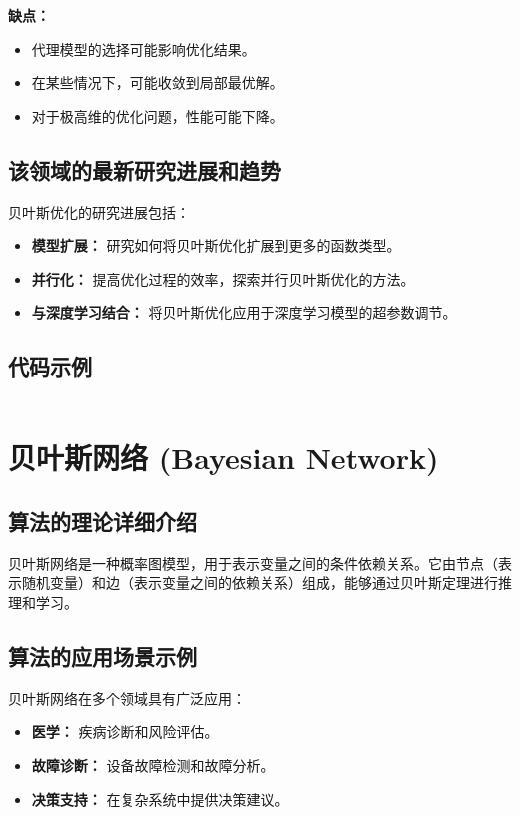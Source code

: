 \textbf{缺点：}
\begin{itemize}
    \item 代理模型的选择可能影响优化结果。
    \item 在某些情况下，可能收敛到局部最优解。
    \item 对于极高维的优化问题，性能可能下降。
\end{itemize}

\subsection*{该领域的最新研究进展和趋势}
贝叶斯优化的研究进展包括：
\begin{itemize}
    \item \textbf{模型扩展：} 研究如何将贝叶斯优化扩展到更多的函数类型。
    \item \textbf{并行化：} 提高优化过程的效率，探索并行贝叶斯优化的方法。
    \item \textbf{与深度学习结合：} 将贝叶斯优化应用于深度学习模型的超参数调节。
\end{itemize}
\subsection*{代码示例}
\begin{lstlisting}

\end{lstlisting}


\section{贝叶斯网络 (Bayesian Network)}
\subsection*{算法的理论详细介绍}
贝叶斯网络是一种概率图模型，用于表示变量之间的条件依赖关系。它由节点（表示随机变量）和边（表示变量之间的依赖关系）组成，能够通过贝叶斯定理进行推理和学习。

\subsection*{算法的应用场景示例}
贝叶斯网络在多个领域具有广泛应用：
\begin{itemize}
    \item \textbf{医学：} 疾病诊断和风险评估。
    \item \textbf{故障诊断：} 设备故障检测和故障分析。
    \item \textbf{决策支持：} 在复杂系统中提供决策建议。
\end{itemize}

